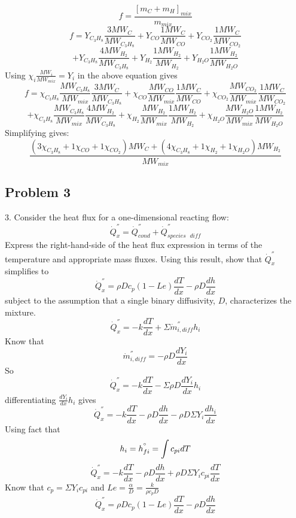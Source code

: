\documentclass[preview,12pt]{article}
\begin{document}
$$f=\frac{[m_C+m_H]_{mix}}{m_{mix}}$$
$$f={Y_{C_3H_8}\frac{3MW_C}{MW_{C_3H_8}}+Y_{CO}}{\frac{1MW_C}{MW_{CO}}+Y_{CO_2}\frac{1MW_C}{MW_{CO_2}}}$$
$$+Y_{C_3H_8}\frac{4MW_H_2}{MW_{C_3H_8}}+Y_{H_2}\frac{1MW_{H_2}}{MW_{H_2}}+Y_{H_2O}\frac{1MW_{H_2}}{MW_{H_2O}}$$
Using $\chi_i\frac{MW_i}{MW_{mix}}=Y_i$ in the above equation gives
$$f=\chi_{C_3H_8}\frac{MW_{C_3H_8}}{MW_{mix}}\frac{3MW_C}{MW_{C_3H_8}}+\chi_{CO}\frac{MW_{CO}}{MW_{mix}}\frac{1MW_C}{MW_{CO}}+\chi_{CO_2}\frac{MW_{CO_2}}{MW_{mix}}\frac{1MW_C}{MW_{CO_2}}$$
$$+\chi_{C_3H_8}\frac{MW_{C_3H_8}}{MW_{mix}}\frac{4MW_H_2}{MW_{C_3H_8}}+\chi_{H_2}\frac{MW_{H_2}}{MW_{mix}}\frac{1MW_{H_2}}{MW_{H_2}}+\chi_{H_2O}\frac{MW_{H_2O}}{MW_{mix}}\frac{1MW_{H_2}}{MW_{H_2O}}$$
Simplifying gives:
$$\frac{(3\chi_{C_3H_8}+1\chi_{CO}+1\chi_{CO_2})MW_C+(4\chi_{C_3H_8}+1\chi_{H_2}+1\chi_{H_2O})MW_{H_2}}{MW_{mix}}$$
$$$$
\begin{center}
    \section*{Problem 3}
\end{center}
3. Consider the heat flux for a one-dimensional reacting flow:
$$\dot{Q}^{''}_x=\dot{Q}^{''}_{cond}+\dot{Q}^{''}_{species \textrm{ } diff}$$
Express the right-hand-side of the heat flux expression in terms of the temperature and appropriate mass fluxes.  Using this result, show that $\dot{Q}^{''}_x$ simplifies to 
$$\dot{Q}^{''}_x=\rho D c_p(1-Le)\frac{dT}{dx}-\rho D\frac{dh}{dx}$$
subject to the assumption that a single binary diffusivity, $D$, characterizes the mixture. 
$$$$
$$\dot{Q}^{''}_x=-k\frac{dT}{dx}+\Sigma\dot{m}^{''}_{i,diff}h_i$$
Know that 
$$\dot{m}^{''}_{i,diff}=-\rho D \frac{dY_i}{dx}$$
So
$$\dot{Q}^{''}_x=-k\frac{dT}{dx}-\Sigma\rho D \frac{dY_i}{dx}h_i$$
differentiating $\frac{dY_i}{dx}h_i$ gives
$$\dot{Q}^{''}_x=-k\frac{dT}{dx}-\rho D\frac{dh}{dx}- \rho D\Sigma Y_i\frac{dh_i}{dx}$$
Using fact that
$$h_i=h^{\degree}_{fi}=\int c_{pi}dT$$
$$\dot{Q}^{''}_x=-k\frac{dT}{dx}-\rho D\frac{dh}{dx}+ \rho D\Sigma Y_ic_{pi}\frac{dT}{dx}$$
Know that $c_p=\Sigma Y_ic_{pi}$ and $Le=\frac{\alpha}{D}=\frac{k}{\rho c_p D}$
$$\dot{Q}^{''}_x=\rho D c_p(1-Le)\frac{dT}{dx}-\rho D\frac{dh}{dx}$$
$$$$
\end{document}
